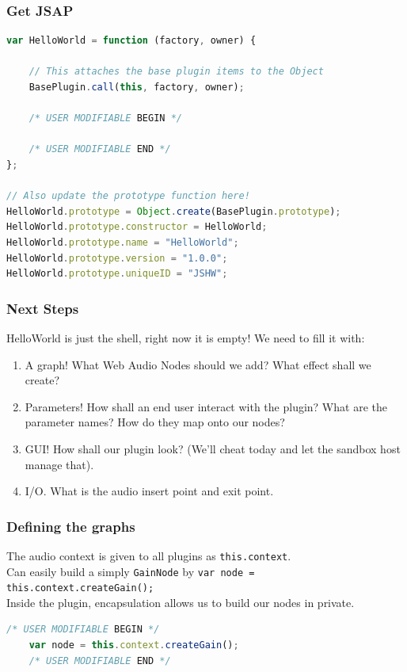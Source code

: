 \documentclass{beamer}
\begin{document}
\begin{frame}[fragile]
\frametitle{Get JSAP}
\begin{lstlisting}[language=javascript]
var HelloWorld = function (factory, owner) {

    // This attaches the base plugin items to the Object
    BasePlugin.call(this, factory, owner);

    /* USER MODIFIABLE BEGIN */

    /* USER MODIFIABLE END */
};

// Also update the prototype function here!
HelloWorld.prototype = Object.create(BasePlugin.prototype);
HelloWorld.prototype.constructor = HelloWorld;
HelloWorld.prototype.name = "HelloWorld";
HelloWorld.prototype.version = "1.0.0";
HelloWorld.prototype.uniqueID = "JSHW";
\end{lstlisting}


\end{frame}

\begin{frame}
\frametitle{Next Steps}
HelloWorld is just the shell, right now it is empty! We need to fill it with:
\begin{enumerate}
\item A graph! What Web Audio Nodes should we add? What effect shall we create?
\item Parameters! How shall an end user interact with the plugin? What are the parameter names? How do they map onto our nodes?
\item GUI! How shall our plugin look? (We'll cheat today and let the sandbox host manage that).
\item I/O. What is the audio insert point and exit point.
\end{enumerate}

\end{frame}

\begin{frame}[fragile]
\frametitle{Defining the graphs}
The audio context is given to all plugins as \texttt{this.context}.\\
Can easily build a simply \texttt{GainNode} by \texttt{var node = this.context.createGain();}\\
Inside the plugin, encapsulation allows us to build our nodes in private.
\begin{lstlisting}[language=javascript]
    /* USER MODIFIABLE BEGIN */
    var node = this.context.createGain();
    /* USER MODIFIABLE END */
\end{lstlisting}
\end{frame}
\end{document}
